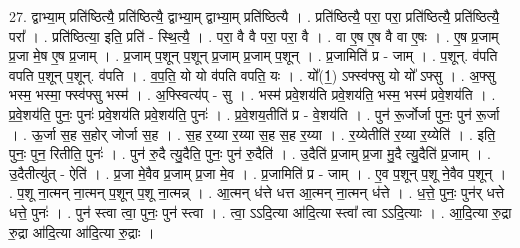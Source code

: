 \documentclass[17pt]{extarticle}
\begin{document}
27. द्वाभ्या॒म् प्रति॑ष्ठित्यै॒ प्रति॑ष्ठित्यै॒ द्वाभ्या॒म् द्वाभ्या॒म् प्रति॑ष्ठित्यै । . प्रति॑ष्ठित्यै॒ परा॒ परा॒ प्रति॑ष्ठित्यै॒ प्रति॑ष्ठित्यै॒ परा᳚ । . प्रति॑ष्ठित्या॒ इति॒ प्रति॑ - स्थि॒त्यै॒ । . परा॒ वै वै परा॒ परा॒ वै । . वा ए॒ष ए॒ष वै वा ए॒षः । . ए॒ष प्र॒जाम् प्र॒जा मे॒ष ए॒ष प्र॒जाम् । . प्र॒जाम् प॒शून् प॒शून् प्र॒जाम् प्र॒जाम् प॒शून् । . प्र॒जामिति॑ प्र - जाम् । . प॒शून्. व॑पति वपति प॒शून् प॒शून्. व॑पति । . व॒प॒ति॒ यो यो व॑पति वपति॒ यः । . यो᳚(1॒) ऽफ्स्व॑फ्सु यो यो᳚ ऽफ्सु । . अ॒फ्सु भस्म॒ भस्मा॒ फ्स्व॑फ्सु भस्म॑ । . अ॒फ्स्वित्य॑प् - सु । . भस्म॑ प्रवे॒शय॑ति प्रवे॒शय॑ति॒ भस्म॒ भस्म॑ प्रवे॒शय॑ति । . प्र॒वे॒शय॑ति॒ पुनः॒ पुनः॑ प्रवे॒शय॑ति प्रवे॒शय॑ति॒ पुनः॑ । . प्र॒वे॒शय॒तीति॑ प्र - वे॒शय॑ति । . पुन॑ रू॒र्जोर्जा पुनः॒ पुन॑ रू॒र्जा । . ऊ॒र्जा स॒ह स॒होर् जोर्जा स॒ह । . स॒ह र॒य्या र॒य्या स॒ह स॒ह र॒य्या । . र॒य्येतीति॑ र॒य्या र॒य्येति॑ । . इति॒ पुनः॒ पुन॒ रितीति॒ पुनः॑ । . पुन॑ रु॒दै त्यु॒दैति॒ पुनः॒ पुन॑ रु॒दैति॑ । . उ॒दैति॑ प्र॒जाम् प्र॒जा मु॒दै त्यु॒दैति॑ प्र॒जाम् । . उ॒दैतीत्यु॑त् - ऐति॑ । . प्र॒जा मे॒वैव प्र॒जाम् प्र॒जा मे॒व । . प्र॒जामिति॑ प्र - जाम् । . ए॒व प॒शून् प॒शू ने॒वैव प॒शून् । . प॒शू ना॒त्मन् ना॒त्मन् प॒शून् प॒शू ना॒त्मन्न् । . आ॒त्मन् ध॑त्ते धत्त आ॒त्मन् ना॒त्मन् ध॑त्ते । . ध॒त्ते॒ पुनः॒ पुन॑र् धत्ते धत्ते॒ पुनः॑ । . पुन॑ स्त्वा त्वा॒ पुनः॒ पुन॑ स्त्वा । . त्वा॒ ऽऽदि॒त्या आ॑दि॒त्या स्त्वा᳚ त्वा ऽऽदि॒त्याः । . आ॒दि॒त्या रु॒द्रा रु॒द्रा आ॑दि॒त्या आ॑दि॒त्या रु॒द्राः । \newline
\end{document}
